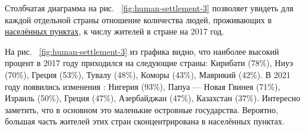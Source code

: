 Столбчатая диаграмма на рис. ~\ref{fig:human-settlement-3} позволяет увидеть для каждой отдельной страны отношение количества людей, проживающих в \href{http://www.wikidata.org/entity/Q486972}{населённых пунктах}, к числу жителей в стране на 2017 год.

\begin{figure*}
    \setlength{\fboxsep}{0pt}%
    \setlength{\fboxrule}{1pt}%
	\label{fig:human-settlement-3}
	\caption[Диаграмма доли населения страны, 2017.]{Диаграмма доли населения страны, проживающего в <<населённых пунктах>> на 2017 год. Ссылка на SPARQL-запрос: \href{https://w.wiki/4dE3}{https://w.wiki/4dE3}}%
\end{figure*} 

\begin{figure*}
    \setlength{\fboxsep}{0pt}%
    \setlength{\fboxrule}{1pt}%
	\label{fig:human-settlement-4}
	\caption[Диаграмма доли населения страны, 2021.]{Диаграмма доли населения страны, проживающего в <<населённых пунктах>> на 2021 год. В 2021 на диаграмму попали только страны с населением более 5 млн человек. Ссылка на SPARQL-запрос: \href{https://w.wiki/4dDx}{https://w.wiki/4dDx}}%
\end{figure*} 

На рис. ~\ref{fig:human-settlement-3} из графика видно, что наиболее высокий процент в 2017 году приходился на следующие страны: Кирибати (78\%), Ниуэ (70\%), Греция (53\%), Тувалу (48\%), Коморы (43\%), Маврикий (42\%). В 2021 году появились изменения : Нигерия (93\%), Папуа — Новая Гвинея (71\%), Израиль (50\%), Греция (47\%), Азербайджан (47\%), Казахстан (37\%). Интересно заметить, что в основном это маленькие островные государства. Вероятно, большая часть жителей этих стран сконцентрирована в населённых пунктах.

